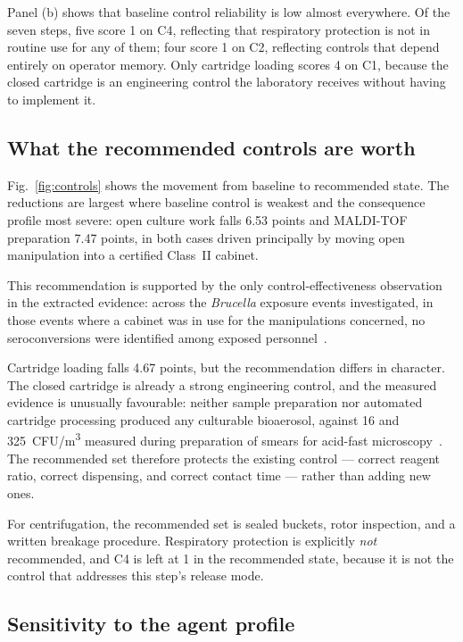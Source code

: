 Panel (b) shows that baseline control reliability is low almost everywhere. Of the seven
steps, five score 1 on C4, reflecting that respiratory protection is not in routine use
for any of them; four score 1 on C2, reflecting controls that depend entirely on operator
memory. Only cartridge loading scores 4 on C1, because the closed cartridge is an
engineering control the laboratory receives without having to implement it.

\subsection{What the recommended controls are worth}

Fig.~\ref{fig:controls} shows the movement from baseline to recommended state. The
reductions are largest where baseline control is weakest and the consequence profile most
severe: open culture work falls 6.53 points and MALDI-TOF preparation 7.47 points, in both
cases driven principally by moving open manipulation into a certified Class~II cabinet.

This recommendation is supported by the only control-effectiveness observation in the
extracted evidence: across the \emph{Brucella} exposure events investigated, in those
events where a cabinet was in use for the manipulations concerned, no seroconversions were
identified among exposed personnel~\cite{ackelsberg2020}.

Cartridge loading falls 4.67 points, but the recommendation differs in character. The
closed cartridge is already a strong engineering control, and the measured evidence is
unusually favourable: neither sample preparation nor automated cartridge processing
produced any culturable bioaerosol, against 16 and 325~CFU/m\textsuperscript{3} measured
during preparation of smears for acid-fast microscopy~\cite{banada2010}. The recommended
set therefore protects the existing control --- correct reagent ratio, correct dispensing,
and correct contact time --- rather than adding new ones.

For centrifugation, the recommended set is sealed buckets, rotor inspection, and a written
breakage procedure. Respiratory protection is explicitly \emph{not} recommended, and C4 is
left at 1 in the recommended state, because it is not the control that addresses this
step's release mode.

\subsection{Sensitivity to the agent profile}

